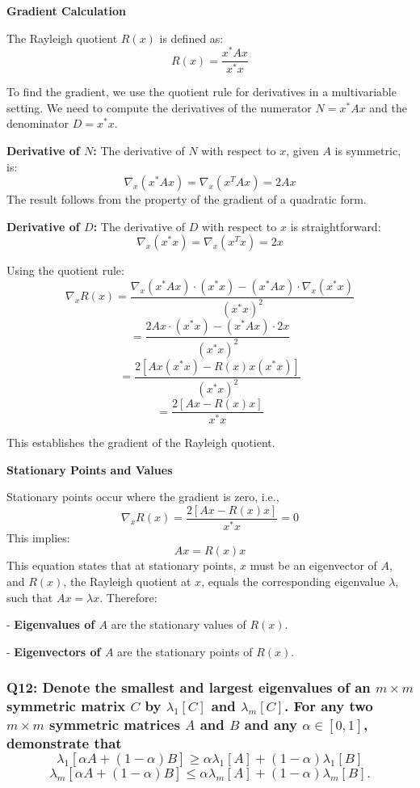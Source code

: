 \documentclass[8pt]{article}
\begin{document}
{\textbf{Gradient Calculation}

The Rayleigh quotient \( R(x) \) is defined as:
\[
R(x) = \frac{x^* A x}{x^* x}
\]

To find the gradient, we use the quotient rule for derivatives in a multivariable setting. We need to compute the derivatives of the numerator \(N = x^* A x\) and the denominator \(D = x^* x\).

\textbf{Derivative of \(N\):}
The derivative of \(N\) with respect to \(x\), given \(A\) is symmetric, is:
\[
\nabla_x (x^* A x) = \nabla_x (x^T A x) = 2Ax
\]
The result follows from the property of the gradient of a quadratic form.

\textbf{Derivative of \(D\):}
The derivative of \(D\) with respect to \(x\) is straightforward:
\[
\nabla_x (x^* x) = \nabla_x (x^T x) = 2x
\]

Using the quotient rule:
\[
\nabla_x R(x) = \frac{\nabla_x (x^* A x) \cdot (x^* x) - (x^* A x) \cdot \nabla_x (x^* x)}{(x^* x)^2}
\]
\[
= \frac{2Ax \cdot (x^* x) - (x^* A x) \cdot 2x}{(x^* x)^2}
\]
\[
= \frac{2[Ax (x^* x) - R(x) x (x^* x)]}{(x^* x)^2}
\]
\[
= \frac{2[Ax - R(x)x]}{x^* x}
\]

This establishes the gradient of the Rayleigh quotient.

\textbf{Stationary Points and Values}

Stationary points occur where the gradient is zero, i.e., 
\[
\nabla_x R(x) = \frac{2[Ax - R(x)x]}{x^* x} = 0
\]
This implies:
\[
Ax = R(x) x
\]
This equation states that at stationary points, \(x\) must be an eigenvector of \(A\), and \(R(x)\), the Rayleigh quotient at \(x\), equals the corresponding eigenvalue \(\lambda\), such that \(Ax = \lambda x\). Therefore:

- \textbf{Eigenvalues of \(A\)} are the stationary values of \(R(x)\).

- \textbf{Eigenvectors of \(A\)} are the stationary points of \(R(x)\).


\subsubsection*{Q12: Denote the smallest and largest eigenvalues of an \(m \times m\) symmetric matrix \(C\) by \(\lambda_1[C]\) and \(\lambda_m[C]\). For any two \(m \times m\) symmetric matrices \(A\) and \(B\) and any \(\alpha \in [0, 1]\), demonstrate that
\[
\lambda_1[\alpha A + (1 - \alpha)B] \geq \alpha \lambda_1[A] + (1 - \alpha) \lambda_1[B]
\]
\[
\lambda_m[\alpha A + (1 - \alpha)B] \leq \alpha \lambda_m[A] + (1 - \alpha) \lambda_m[B].
\]
}

}
\end{document}
